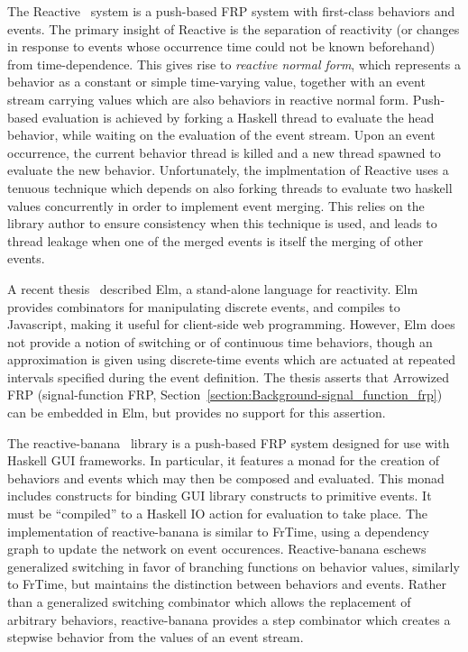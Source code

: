 The Reactive~\cite{Elliott2009} system is a push-based FRP system with
first-class behaviors and events. The primary insight of Reactive is the
separation of reactivity (or changes in response to events whose occurrence time
could not be known beforehand) from time-dependence. This gives rise to {\em
reactive normal form}, which represents a behavior as a constant or simple
time-varying value, together with an event stream carrying values which are also
behaviors in reactive normal form. Push-based evaluation is achieved by forking
a Haskell thread to evaluate the head behavior, while waiting on the evaluation
of the event stream. Upon an event occurrence, the current behavior thread is
killed and a new thread spawned to evaluate the new behavior. Unfortunately, the
implmentation of Reactive uses a tenuous technique which depends on also forking
threads to evaluate two haskell values concurrently in order to implement event
merging. This relies on the library author to ensure consistency when this
technique is used, and leads to thread leakage when one of the merged events is
itself the merging of other events.

A recent thesis~\cite{Czaplicki2012} described Elm, a stand-alone language for
reactivity. Elm provides combinators for manipulating discrete events, and
compiles to Javascript, making it useful for client-side web programming.
However, Elm does not provide a notion of switching or of continuous time
behaviors, though an approximation is given using discrete-time events which are
actuated at repeated intervals specified during the event definition. The thesis
asserts that Arrowized FRP (signal-function FRP, Section~\ref{section:Background-signal_function_frp})
can be embedded in Elm, but provides no support for this assertion.

The reactive-banana~\cite{Apfelmus} library is a push-based FRP system designed
for use with Haskell GUI frameworks. In particular, it features a monad for
the creation of behaviors and events which may then be composed and evaluated.
This monad includes constructs for binding GUI library constructs to primitive
events. It must be ``compiled'' to a Haskell IO action for evaluation to take
place. The implementation of reactive-banana is similar to FrTime, using a
dependency graph to update the network on event occurences. Reactive-banana
eschews generalized switching in favor of branching functions on behavior
values, similarly to FrTime, but maintains the distinction between behaviors and
events. Rather than a generalized switching combinator which allows the
replacement of arbitrary behaviors, reactive-banana provides a step combinator
which creates a stepwise behavior from the values of an event stream.

